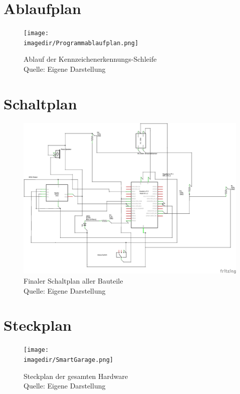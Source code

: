 \chapter{Ablaufplan}
\begin{figure}[H]
	\centering 
	\texttt{[image: \\imagedir/Programmablaufplan.png]}
	\captionsetup{format=hang}
	\caption[Programmablauf]{\label{Ablaufplan}Ablauf der Kennzeichenerkennungs-Schleife \\Quelle: Eigene Darstellung}
\end{figure}
\chapter{Schaltplan}
\begin{figure}[h]
	\centering
	\includegraphics[width=1\linewidth]{img/SmartGarage_Schaltplan}
	\caption[Schaltplan]{Finaler Schaltplan aller Bauteile \\ Quelle: Eigene Darstellung}
	\label{Schaltplan}
\end{figure}

\chapter{Steckplan}
\begin{figure}[H]
	\centering 
	\label{Steckplan}
	\texttt{[image: \\imagedir/SmartGarage.png]}
	\captionsetup{format=hang}
	\caption[Steckplan groß]{Steckplan der gesamten Hardware \\Quelle: Eigene Darstellung}
\end{figure}
